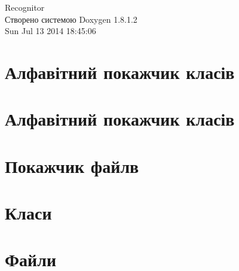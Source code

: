 \documentclass{book}
\begin{document}
\hypersetup{pageanchor=false,citecolor=blue}
\begin{titlepage}
\vspace*{7cm}
\begin{center}
{\Large Recognitor }\\
\vspace*{1cm}
{\large Створено системою Doxygen 1.8.1.2}\\
\vspace*{0.5cm}
{\small Sun Jul 13 2014 18:45:06}\\
\end{center}
\end{titlepage}
\clearemptydoublepage
{}
\tableofcontents
\clearemptydoublepage
{}
\hypersetup{pageanchor=true,citecolor=blue}
\chapter{Алфавітний покажчик класів}

\chapter{Алфавітний покажчик класів}

\chapter{Покажчик файлв}

\chapter{Класи}





















\chapter{Файли}





















\printindex
\end{document}
